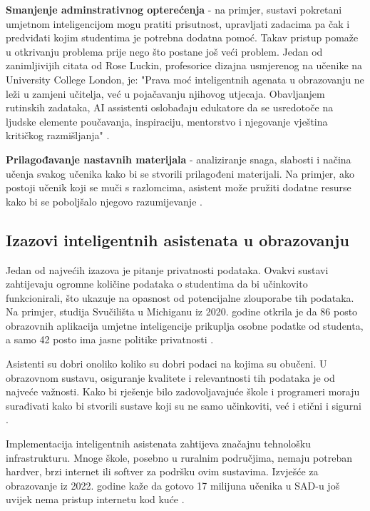 \documentclass[]{foi}
\begin{document}
    \textbf{Smanjenje adminstrativnog opterećenja} - na primjer, sustavi pokretani umjetnom inteligencijom mogu pratiti prisutnost, upravljati zadacima pa čak i predviđati kojim
    studentima je potrebna dodatna pomoć. Takav pristup pomaže u otkrivanju problema prije nego što postane još veći problem. Jedan od zanimljivijih citata od Rose Luckin, profesorice dizajna
    usmjerenog na učenike na University College London, je: "Prava moć inteligentnih agenata u obrazovanju ne leži u zamjeni učitelja, već u pojačavanju njihovog utjecaja. Obavljanjem rutinskih
    zadataka, AI assistenti oslobađaju edukatore da se usredotoče na ljudske elemente poučavanja, inspiraciju, mentorstvo i njegovanje vještina kritičkog razmišljanja" \cite{weber2025smythos}. 
    
    
    \textbf{Prilagođavanje nastavnih materijala}   - analiziranje snaga, slabosti i načina učenja svakog učenika kako bi se stvorili prilagođeni materijali. Na primjer, ako postoji
    učenik koji se muči s razlomcima, asistent može pružiti dodatne resurse kako bi se poboljšalo njegovo razumijevanje \cite{weber2025smythos}.


\subsection{Izazovi inteligentnih asistenata u obrazovanju}

Jedan od najvećih izazova je pitanje privatnosti podataka. Ovakvi sustavi zahtijevaju ogromne količine podataka o studentima da bi učinkovito funkcionirali, što ukazuje na opasnost od 
potencijalne zlouporabe tih podataka. Na primjer, studija Svučilišta u Michiganu iz 2020. godine otkrila je da 86 posto obrazovnih aplikacija umjetne inteligencije prikuplja osobne podatke od studenta,
a samo 42 posto ima jasne politike privatnosti \cite{weber2025smythos}.

Asistenti su dobri onoliko koliko su dobri podaci na kojima su obučeni. U obrazovnom sustavu, osiguranje kvalitete i relevantnosti tih podataka je od najveće važnosti.
Kako bi rješenje bilo zadovoljavajuće škole i programeri moraju surađivati kako bi stvorili sustave koji su ne samo učinkoviti, već i etični i sigurni \cite{weber2025smythos}.

Implementacija inteligentnih asistenata zahtijeva značajnu tehnološku infrastrukturu. Mnoge škole, posebno u ruralnim područjima, nemaju potreban hardver, brzi internet ili softver za podršku ovim sustavima.
Izvješće za obrazovanje iz 2022. godine kaže da gotovo 17 milijuna učenika u SAD-u još uvijek nema pristup internetu kod kuće \cite{weber2025smythos}.
\end{document}
